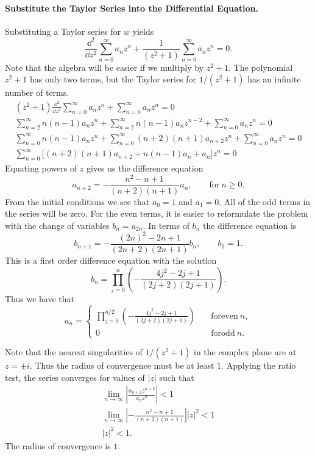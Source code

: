 \begin{Example}
  \paragraph{Substitute the Taylor Series into the Differential Equation.}
  Substituting a Taylor series for $w$ yields
  \[ \frac{\dd^2}{\dd z^2} \sum_{n=0}^\infty a_n z^n + \frac{1}{(z^2 + 1)}
  \sum_{n=0}^\infty a_n z^n=0. \]
  Note that the algebra will be easier if we multiply by $z^2+1$.  The 
  polynomial $z^2+1$ has only two terms, but the Taylor series for
  $1/(z^2+1)$ has an infinite number of terms.
  \begin{gather*}
    (z^2 + 1)\frac{\dd^2}{\dd z^2} \sum_{n=0}^\infty a_n z^n + \sum_{n=0}^\infty a_n z^n=0\\
    \sum_{n=2}^\infty n(n-1)a_n z^n + \sum_{n=2}^\infty n(n-1)a_n z^{n-2}
    + \sum_{n=0}^\infty a_n z^n = 0 \\
    \sum_{n=0}^\infty n(n-1)a_n z^n
    + \sum_{n=0}^\infty (n+2)(n+1)a_{n+2} z^n
    + \sum_{n=0}^\infty a_n z^n = 0 \\
    \sum_{n=0}^\infty \Big[(n+2)(n+1)a_{n+2} + n(n-1)a_n + a_n \Big] z^n = 0
  \end{gather*}
  Equating powers of $z$ gives us the difference equation
  \[a_{n+2} = - \frac{n^2 - n + 1}{(n+2)(n+1)}a_n, \qquad \mathrm{for}\ n \geq 0.\]
  From the initial conditions we see that $a_0 = 1$ and $a_1 = 0$.  
  All of the odd terms in the series will be zero.  
  For the even terms, it is easier to reformulate the problem with 
  the change of variables 
  $b_n = a_{2n}$.  In terms of $b_n$ the difference equation is
  \[ b_{n+1} = - \frac{(2n)^2 - 2n + 1}{(2n+2)(2n+1)}b_{n}, \qquad b_0 = 1.\]
  This is a first order difference equation with the solution
  \[b_n = \prod_{j=0}^n \left(- \frac{4j^2 - 2j + 1}{(2j+2)(2j+1)}\right).\]
  Thus we have that
  \[a_n = 
  \begin{cases}
    \prod_{j=0}^{n/2} \left(- \frac{4j^2 - 2j + 1}{(2j+2)(2j+1)}\right)
    \quad &\mathrm{for even}\ n, \\
    0 & \mathrm{for odd}\  n.
  \end{cases}
  \]

  Note that the nearest singularities of $1/(z^2+1)$ in the complex plane are
  at $z = \pm i$.  Thus the radius of convergence must be at
  least $1$. 
  Applying the ratio test, the series converges for values of $|z|$ such that
  \begin{gather*}
    \lim_{n \to \infty} \left| \frac{a_{n+2} z^{n+2}}{a_n z^n}\right| < 1 \\
    \lim_{n \to \infty} \left| - \frac{n^2 - n + 1}{(n+2)(n+1)}\right| |z|^2
    < 1 \\
    |z|^2 < 1.
  \end{gather*}
  The radius of convergence is $1$.


\end{Example}
